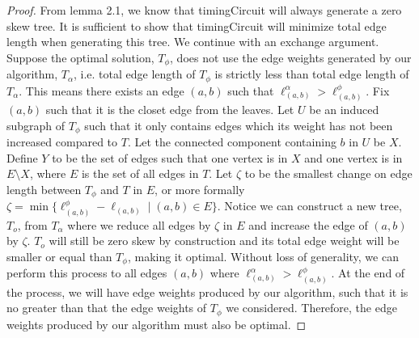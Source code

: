 \documentclass[11pt]{scrartcl}
\begin{document}
\begin{proof}
	From lemma 2.1, we know that timingCircuit will always generate a zero skew tree. 
	It is sufficient to show that timingCircuit will minimize total edge length when
	generating this tree. %
	We continue with an exchange argument.
	Suppose the optimal solution, $T_\phi$, does not use the edge weights generated by our algorithm, $T_\alpha$,
	i.e. total edge length of $T_\phi$ is strictly less than total edge length of $T_\alpha$.
	This means there exists an edge $(a,b)$ such that $\ell^\alpha_{(a,b)} > \ell^\phi_{(a,b)}$.
	Fix $(a,b)$ such that it is the closet edge from the leaves. 
	Let $U$ be an induced subgraph of $T_\phi$ such that it only contains edges 
	which its weight has not been increased compared to $T$. Let the connected component 
	containing $b$ in $U$ be $X$.
	Define $Y$ to be the set of edges such that one vertex is in $X$ and one vertex is in $E \setminus X$,
	where $E$ is the set of all edges in $T$. Let $\zeta$ to be the smallest 
	change on edge length between $T_\phi$ and $T$ in $E$, or more formally 
	$\zeta = \min\{\ell^\phi_{(a,b)} - \ell_{(a,b)}  \mid (a,b) \in E \} $.
	Notice we can construct a new tree, $T_o$, from $T_\alpha$ where we reduce all edges by $\zeta$
	in $E$ and increase the edge of $(a,b)$ by $\zeta$. $T_o$ will still be zero skew by construction
	and its total edge weight will be smaller or equal than $T_\phi$, making it optimal.
	Without loss of generality, we can perform this process to all edges $(a,b)$ where
	$\ell^\alpha_{(a,b)} > \ell^\phi_{(a,b)}$. 
	At the end of the process, we will have edge weights produced by our algorithm,
	such that it is no greater than that the edge weights of $T_\phi$ we considered.
	Therefore, the edge weights produced by our algorithm must also be optimal.

	
\end{proof}
\end{document}
